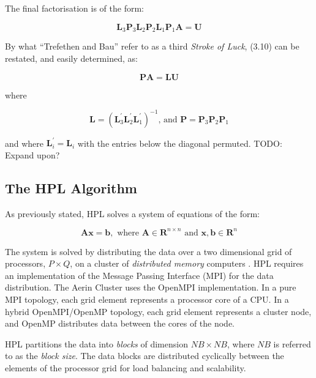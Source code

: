 The final factorisation is of the form:

\begin{equation}
\mathbf{L}_3\mathbf{P}_3\mathbf{L}_2\mathbf{P}_2\mathbf{L}_1\mathbf{P}_1\mathbf{A} = \mathbf{U}
\end{equation}

By what ``Trefethen and Bau'' \cite{numerical-linear-algebra} refer to as a third \emph{Stroke of Luck}, (3.10) can be restated, and easily determined, as:

\begin{equation}
\mathbf{P}\mathbf{A} = \mathbf{L}\mathbf{U}
\end{equation}

where

\begin{equation}
\mathbf{L} = (\mathbf{L}_3^{'}\mathbf{L}_2^{'}\mathbf{L}_1^{'})^{-1} \text{, and } \mathbf{P} = \mathbf{P}_3\mathbf{P}_2\mathbf{P}_1
\end{equation}

and where $\mathbf{L}_i^{'} = \mathbf{L}_i$ with the entries below the diagonal permuted. TODO: Expand upon?


%
%
\subsection{The HPL Algorithm}

As previously stated, HPL solves a system of equations of the form:

\begin{equation}
\mathbf{Ax} = \mathbf{b},\text{ where }\mathbf{A} \in \mathbf{R}^{n\times n}\text{ and }\mathbf{x}, \mathbf{b} \in \mathbf{R}^n
\end{equation} 

The system is solved by distributing the data over a two dimensional grid of processors, $P \times Q$, on a cluster of \emph{distributed memory} computers \cite{linpack-ppf}. HPL requires an implementation of the Message Passing Interface (MPI) for the data distribution. The Aerin Cluster uses the OpenMPI implementation. In a pure MPI topology, each grid element represents a processor core of a CPU. In a hybrid OpenMPI/OpenMP topology, each grid element represents a cluster node, and OpenMP distributes data between the cores of the node.   

HPL partitions the data into \emph{blocks} of dimension $NB \times NB$, where $NB$ is referred to as the \emph{block size}. The data blocks are distributed cyclically between the elements of the processor grid for load balancing and scalability. 

